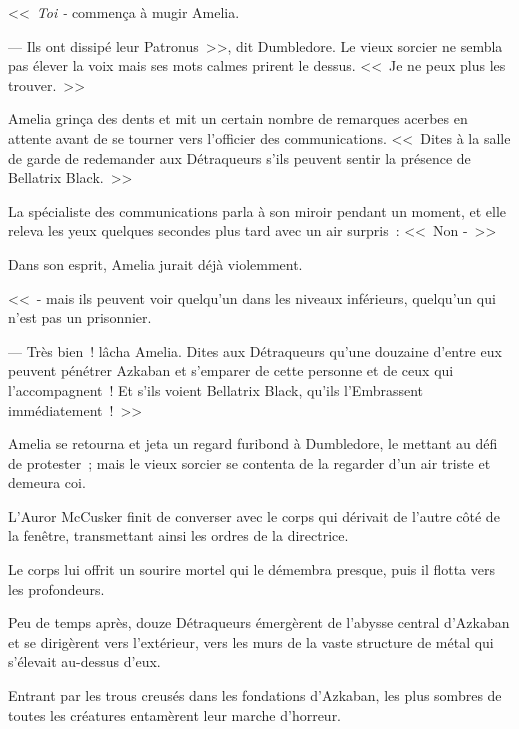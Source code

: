 <<~\emph{Toi -} commença à mugir Amelia.

--- Ils ont dissipé leur Patronus~>>, dit Dumbledore. Le vieux sorcier ne sembla pas élever la voix mais ses mots calmes prirent le dessus. <<~Je ne peux plus les trouver.~>>

Amelia grinça des dents et mit un certain nombre de remarques acerbes en attente avant de se tourner vers l'officier des communications. <<~Dites à la salle de garde de redemander aux Détraqueurs s'ils peuvent sentir la présence de Bellatrix Black.~>>

La spécialiste des communications parla à son miroir pendant un moment, et elle releva les yeux quelques secondes plus tard avec un air surpris~: <<~Non -~>>

Dans son esprit, Amelia jurait déjà violemment.

<<~- mais ils peuvent voir quelqu'un dans les niveaux inférieurs, quelqu'un qui n'est pas un prisonnier.

--- Très bien~! lâcha Amelia. Dites aux Détraqueurs qu'une douzaine d'entre eux peuvent pénétrer Azkaban et s'emparer de cette personne et de ceux qui l'accompagnent~! Et s'ils voient Bellatrix Black, qu'ils l'Embrassent immédiatement~!~>>

Amelia se retourna et jeta un regard furibond à Dumbledore, le mettant au défi de protester~; mais le vieux sorcier se contenta de la regarder d'un air triste et demeura coi.

\later

L'Auror McCusker finit de converser avec le corps qui dérivait de l'autre côté de la fenêtre, transmettant ainsi les ordres de la directrice.

Le corps lui offrit un sourire mortel qui le démembra presque, puis il flotta vers les profondeurs.

Peu de temps après, douze Détraqueurs émergèrent de l'abysse central d'Azkaban et se dirigèrent vers l'extérieur, vers les murs de la vaste structure de métal qui s'élevait au-dessus d'eux.

Entrant par les trous creusés dans les fondations d'Azkaban, les plus sombres de toutes les créatures entamèrent leur marche d'horreur.
